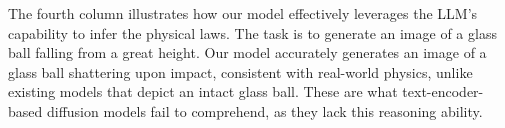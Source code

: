 
The fourth column illustrates how our model effectively leverages the LLM's capability to infer the physical laws. The task is to generate an image of a glass ball falling from a great height. Our model accurately generates an image of a glass ball shattering upon impact, consistent with real-world physics, unlike existing models that depict an intact glass ball. These are what text-encoder-based diffusion models fail to comprehend, as they lack this reasoning ability.


